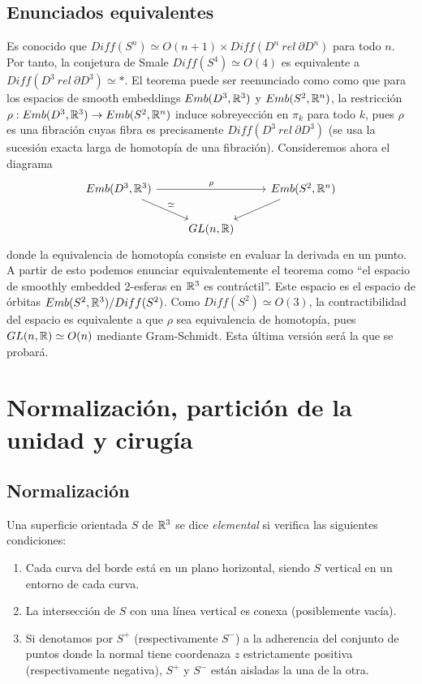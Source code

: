\documentclass[twoside, 11pt]{article}
\begin{document}
\subsection{Enunciados equivalentes}
Es conocido que $Diff(S^n)\simeq O(n+1)\times Diff(D^n\ rel\ \partial D^n)$ para todo $n$. Por tanto, la conjetura de Smale $Diff(S^4)\simeq O(4)$ es equivalente a $Diff(D^3\ rel\ \partial D^3)\simeq *$. El teorema puede ser reenunciado como como que para los espacios de smooth embeddings $Emb(D^3,\mathbb{R}^3)$ y $Emb(S^2,\mathbb{R}^n)$, la restricción $\rho:Emb(D^3,\mathbb{R}^3)\to Emb(S^2,\mathbb{R}^n)$ induce sobreyección en $\pi_k$ para todo $k$, pues $\rho$ es una fibración cuyas fibra es precisamente $Diff(D^3\ rel\ \partial D^3)$ (se usa la sucesión exacta larga de homotopía de una fibración). Consideremos ahora el diagrama
\[
\begin{tikzcd}
Emb(D^3,\R^3)\arrow[rr, "\rho"] \arrow[dr, "\simeq"]& & Emb(S^2,\R^n)\arrow[dl]\\
&GL(n,\R)&
\end{tikzcd}
\]
donde la equivalencia de homotopía consiste en evaluar la derivada en un punto. A partir de esto podemos enunciar equivalentemente el teorema como ``el espacio de smoothly embedded 2-esferas en $\mathbb{R}^3$ es contráctil''. Este espacio es el espacio de órbitas $Emb(S^2,\mathbb{R}^3)/Diff(S^2)$. Como $Diff(S^2)\simeq O(3)$, la contractibilidad del espacio es equivalente a que $\rho$ sea equivalencia de homotopía, pues $GL(n,\mathbb{R})\simeq O(n)$ mediante Gram-Schmidt. Esta última versión será la que se probará.


\section{Normalización, partición de la unidad y cirugía}
\subsection{Normalización}
\begin{defi}
Una superficie orientada $S$ de $\mathbb{R}^3$ se dice \emph{elemental} si verifica las siguientes condiciones:
\begin{enumerate}
\item Cada curva del borde está en un plano horizontal, siendo $S$ vertical en un entorno de cada curva. 
\item La intersección de $S$ con una línea vertical es conexa (posiblemente vacía).
\item Si denotamos por $S^+$ (respectivamente $S^-$) a la adherencia del conjunto de puntos donde la normal tiene coordenaza $z$ estrictamente positiva (respectivamente negativa), $S^+$ y $S^-$ están aisladas la una de la otra. 
\end{enumerate}
\end{defi}
\end{document}
